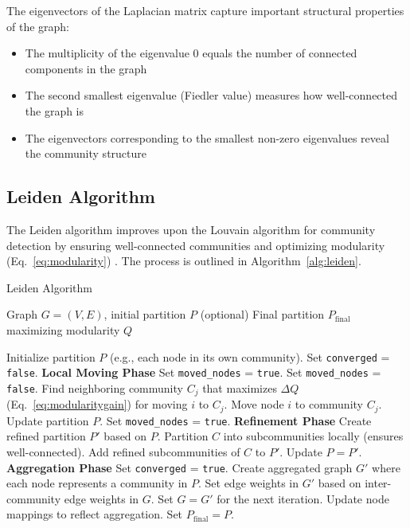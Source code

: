 The eigenvectors of the Laplacian matrix capture important structural properties of the graph:
\begin{itemize}
    \item The multiplicity of the eigenvalue 0 equals the number of connected components in the graph
    \item The second smallest eigenvalue (Fiedler value) measures how well-connected the graph is
    \item The eigenvectors corresponding to the smallest non-zero eigenvalues reveal the community structure
\end{itemize}

\subsection{Leiden Algorithm}
\label{subsec:LeidenAlgorithm}

The Leiden algorithm improves upon the Louvain algorithm for community detection by ensuring well-connected communities and optimizing modularity (Eq.~\eqref{eq:modularity}) . The process is outlined in Algorithm~\ref{alg:leiden}.

\begin{algorithm}[H]
\caption{Leiden Algorithm}
\label{alg:leiden}
\begin{algorithmic}[1]
\Require Graph $G = (V, E)$, initial partition $P$ (optional)
\Ensure Final partition $P_{\text{final}}$ maximizing modularity $Q$

\State Initialize partition $P$ (e.g., each node in its own community).
\State Set \texttt{converged} = \texttt{false}.
    \State \textbf{Local Moving Phase}
    \State Set \texttt{moved\_nodes} = \texttt{true}.
        \State Set \texttt{moved\_nodes} = \texttt{false}.
            \State Find neighboring community $C_j$ that maximizes $\Delta Q$ (Eq.~\eqref{eq:modularitygain}) for moving $i$ to $C_j$.
                \State Move node $i$ to community $C_j$.
                \State Update partition $P$.
                \State Set \texttt{moved\_nodes} = \texttt{true}.
            \EndIf
        \EndFor
    \EndWhile
    \State \textbf{Refinement Phase}
    \State Create refined partition $P'$ based on $P$.
        \State Partition $C$ into subcommunities locally (ensures well-connected).
        \State Add refined subcommunities of $C$ to $P'$.
    \EndFor
    \State Update $P = P'$.
    \State \textbf{Aggregation Phase}
        \State Set \texttt{converged} = \texttt{true}.
    \Else
        \State Create aggregated graph $G'$ where each node represents a community in $P$.
        \State Set edge weights in $G'$ based on inter-community edge weights in $G$.
        \State Set $G = G'$ for the next iteration.
        \State Update node mappings to reflect aggregation.
    \EndIf
\EndWhile
\State Set $P_{\text{final}} = P$.
\end{algorithmic}
\end{algorithm}

